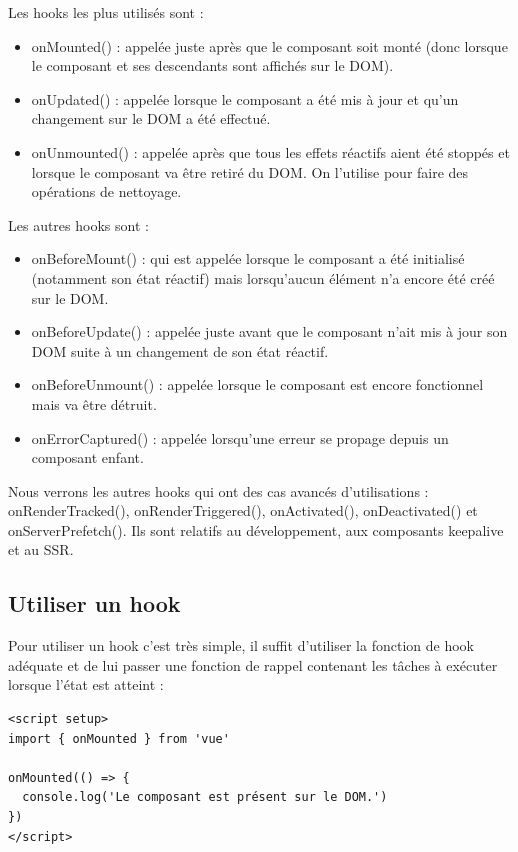 \documentclass{article}
\begin{document}
Les {\color{monOrange}hooks} les plus utilisés sont :
\begin{itemize}
\item {\color{monOrange}onMounted()} : appelée juste après que le composant soit monté (donc lorsque le composant et ses descendants sont affichés sur le DOM).

\item {\color{monOrange}onUpdated()} : appelée lorsque le composant a été mis à jour et qu'un changement sur le DOM a été effectué.

\item {\color{monOrange}onUnmounted()} : appelée après que tous les effets réactifs aient été stoppés et lorsque le composant va être retiré du DOM. On l'utilise pour faire des opérations de nettoyage.
\end{itemize}
Les autres hooks sont :
\begin{itemize}
\item {\color{monOrange}onBeforeMount()} : qui est appelée lorsque le composant a été initialisé (notamment son état réactif) mais lorsqu'aucun élément n'a encore été créé sur le DOM.

\item {\color{monOrange}onBeforeUpdate()} : appelée juste avant que le composant n'ait mis à jour son DOM suite à un changement de son état réactif.

\item {\color{monOrange}onBeforeUnmount()} : appelée lorsque le composant est encore fonctionnel mais va être détruit.

\item {\color{monOrange}onErrorCaptured()} : appelée lorsqu'une erreur se propage depuis un composant enfant.

\end{itemize}

Nous verrons les autres {\color{monOrange}hooks} qui ont des cas avancés d'utilisations : {\color{monOrange} onRenderTracked(), onRenderTriggered(), onActivated(), onDeactivated() et onServerPrefetch()}. Ils sont relatifs au développement, aux composants {\color{monOrange}keepalive} et au {\color{monOrange}SSR}.

\subsection{Utiliser un {\color{monOrange}hook}}
Pour utiliser un hook c'est très simple, il suffit d'utiliser la fonction de {\color{monOrange}hook} adéquate et de lui passer une fonction de rappel contenant les tâches à exécuter lorsque l'état est atteint :
\begin{verbatim}
<script setup>
import { onMounted } from 'vue'

onMounted(() => {
  console.log('Le composant est présent sur le DOM.')
})
</script>
\end{verbatim}
\end{document}
